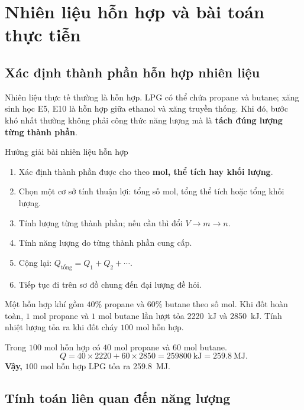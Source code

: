 \section{Nhiên liệu hỗn hợp và bài toán thực tiễn}

\subsection{Xác định thành phần hỗn hợp nhiên liệu}

Nhiên liệu thực tế thường là hỗn hợp. LPG có thể chứa propane và butane; xăng sinh học E5, E10 là hỗn hợp giữa ethanol và xăng truyền thống. Khi đó, bước khó nhất thường không phải công thức năng lượng mà là \textbf{tách đúng lượng từng thành phần}.

\begin{ghinho}{Hướng giải bài nhiên liệu hỗn hợp}
\begin{enumerate}
\item Xác định thành phần được cho theo \textbf{mol, thể tích hay khối lượng}.
\item Chọn một cơ sở tính thuận lợi: tổng số mol, tổng thể tích hoặc tổng khối lượng.
\item Tính lượng từng thành phần; nếu cần thì đổi $V\to m\to n$.
\item Tính năng lượng do từng thành phần cung cấp.
\item Cộng lại: $Q_{\text{tổng}}=Q_1+Q_2+\cdots$.
\item Tiếp tục đi trên sơ đồ chung đến đại lượng đề hỏi.
\end{enumerate}
\end{ghinho}

\begin{vidu}
Một hỗn hợp khí gồm $40\%$ propane và $60\%$ butane theo số mol. Khi đốt hoàn toàn, $1$ mol propane và $1$ mol butane lần lượt tỏa \SI{2220}{\kilo\joule} và \SI{2850}{\kilo\joule}. Tính nhiệt lượng tỏa ra khi đốt cháy $100$ mol hỗn hợp.
\end{vidu}
\begin{loigiai}
Trong $100$ mol hỗn hợp có $40$ mol propane và $60$ mol butane.
\[
Q=40\times2220+60\times2850=\SI{259800}{\kilo\joule}
=\SI{259.8}{\mega\joule}.
\]
\textbf{Vậy,} $100$ mol hỗn hợp LPG tỏa ra \SI{259.8}{\mega\joule}.
\end{loigiai}

\subsection{Tính toán liên quan đến năng lượng}

